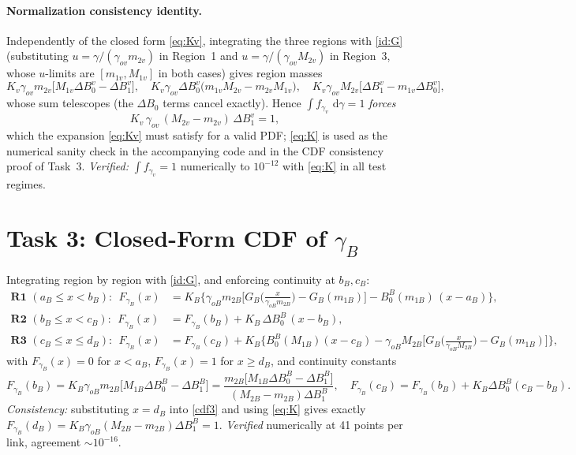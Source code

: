 \documentclass[11pt]{article}
\newcommand{\dd}{\,\mathrm{d}}
\begin{document}
\paragraph{Normalization consistency identity.} Independently of the closed form \eqref{eq:Kv}, integrating the three regions with \eqref{id:G} (substituting $u=\gamma/(\gamma_{ov}m_{2v})$ in Region~1 and $u=\gamma/(\gamma_{ov}M_{2v})$ in Region~3, whose $u$-limits are $[m_{1v},M_{1v}]$ in both cases) gives region masses
\[
K_v\gamma_{ov}m_{2v}\big[M_{1v}\Delta B_0^{v}-\Delta B_1^{v}\big],\quad
K_v\gamma_{ov}\Delta B_0^{v}\big(m_{1v}M_{2v}-m_{2v}M_{1v}\big),\quad
K_v\gamma_{ov}M_{2v}\big[\Delta B_1^{v}-m_{1v}\Delta B_0^{v}\big],
\]
whose sum telescopes (the $\Delta B_0$ terms cancel exactly). Hence $\int f_{\gamma_v}\,\dd\gamma=1$ \emph{forces}
\begin{equation}
K_v\,\gamma_{ov}\,(M_{2v}-m_{2v})\,\Delta B_1^{v}=1,
\label{eq:K}
\end{equation}
which the expansion \eqref{eq:Kv} must satisfy for a valid PDF; \eqref{eq:K} is used as the numerical sanity check in the accompanying code and in the CDF consistency proof of Task~3. \emph{Verified:} $\int f_{\gamma_v}=1$ numerically to $10^{-12}$ with \eqref{eq:K} in all test regimes.

\section{Task 3: Closed-Form CDF of $\gamma_B$}
Integrating region by region with \eqref{id:G}, and enforcing continuity at $b_B,c_B$:
\begin{align}
\textbf{R1 } (a_B\le x<b_B):\ \
F_{\gamma_B}(x)&=K_B\Big\{\gamma_{oB}m_{2B}\Big[G_B\!\big(\tfrac{x}{\gamma_{oB}m_{2B}}\big)-G_B(m_{1B})\Big]-B_0^{B}(m_{1B})\,(x-a_B)\Big\},\label{cdf1}\\[1mm]
\textbf{R2 } (b_B\le x<c_B):\ \
F_{\gamma_B}(x)&=F_{\gamma_B}(b_B)+K_B\,\Delta B_0^{B}\,(x-b_B),\label{cdf2}\\[1mm]
\textbf{R3 } (c_B\le x\le d_B):\ \
F_{\gamma_B}(x)&=F_{\gamma_B}(c_B)+K_B\Big\{B_0^{B}(M_{1B})(x-c_B)
-\gamma_{oB}M_{2B}\Big[G_B\!\big(\tfrac{x}{\gamma_{oB}M_{2B}}\big)-G_B(m_{1B})\Big]\Big\},\label{cdf3}
\end{align}
with $F_{\gamma_B}(x)=0$ for $x<a_B$, $F_{\gamma_B}(x)=1$ for $x\ge d_B$, and continuity constants
\begin{equation}
F_{\gamma_B}(b_B)=K_B\gamma_{oB}m_{2B}\big[M_{1B}\Delta B_0^{B}-\Delta B_1^{B}\big]
=\frac{m_{2B}\big[M_{1B}\Delta B_0^{B}-\Delta B_1^{B}\big]}{(M_{2B}-m_{2B})\Delta B_1^{B}},
\quad
F_{\gamma_B}(c_B)=F_{\gamma_B}(b_B)+K_B\Delta B_0^{B}(c_B-b_B).
\end{equation}
\emph{Consistency:} substituting $x=d_B$ into \eqref{cdf3} and using \eqref{eq:K} gives exactly
$F_{\gamma_B}(d_B)=K_B\gamma_{oB}(M_{2B}-m_{2B})\Delta B_1^{B}=1$. \emph{Verified} numerically at 41 points per link, agreement $\sim 10^{-16}$.
\end{document}
